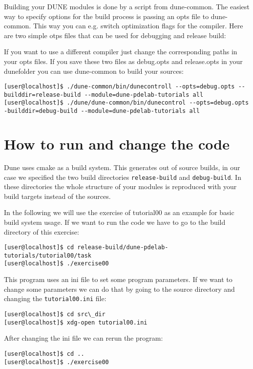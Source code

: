 \documentclass[12pt,a4paper]{article}
\begin{document}
Building your DUNE modules is done by a script from dune-common.  The
easiest way to specify  options for the build process is passing an
opts file to dune-common.  This way you can e.g. switch optimization
flags for the compiler.  Here are two simple otps files that can be
used for debugging and release build:




If you want to use a different compiler just change the corresponding
paths in your opts files.  If you save these two files as debug.opts
and release.opts in your dunefolder you can use dune-common to build
your sources:

\begin{lstlisting}
[user@localhost]$ ./dune-common/bin/dunecontroll --opts=debug.opts --builddir=release-build --module=dune-pdelab-tutorials all
[user@localhost]$ ./dune/dune-common/bin/dunecontrol --opts=debug.opts -builddir=debug-build --module=dune-pdelab-tutorials all
\end{lstlisting}

\section{How to run and change the code}

Dune uses cmake as a build system.  This generates out of source
builds, in our case we specified the two build directories
\lstinline{release-build} and \lstinline{debug-build}.  In these
directories the whole structure of your modules is reproduced with
your build targets instead of the sources.

In the following we will use the exercise of tutorial00 as an example
for basic build system usage. If we want to run the code we have to go
to the build directory of this exercise:
\begin{lstlisting}
[user@localhost]$ cd release-build/dune-pdelab-tutorials/tutorial00/task
[user@localhost]$ ./exercise00
\end{lstlisting}

This program uses an ini file to set some program parameters. If we
want to change some parameters we can do that by going to the source
directory and changing the \lstinline{tutorial00.ini} file:
\begin{lstlisting}
[user@localhost]$ cd src\_dir
[user@localhost]$ xdg-open tutorial00.ini
\end{lstlisting}
After changing the ini file we can rerun the program:
\begin{lstlisting}
[user@localhost]$ cd ..
[user@localhost]$ ./exercise00
\end{lstlisting}
\end{document}
